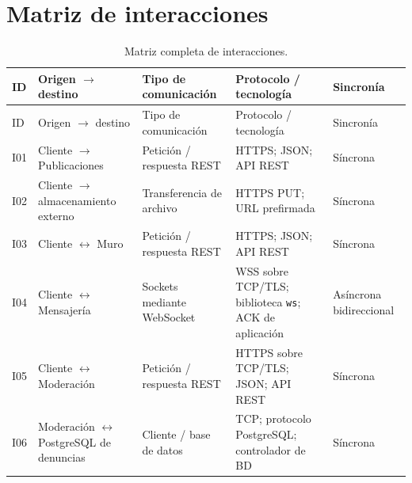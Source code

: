 \documentclass[12pt,a4paper]{article}
\begin{document}

\section{Matriz de interacciones}

\begingroup
\small

\begin{longtable}{@{}p{0.9cm}p{4.4cm}p{2.7cm}p{4.4cm}p{1.8cm}@{}}

\caption{Matriz completa de interacciones.}
\label{tab:interacciones} \\

\toprule
ID & Origen $\rightarrow$ destino & Tipo de comunicación & Protocolo / tecnología & Sincronía \\

\midrule
\endfirsthead

\toprule
ID & Origen $\rightarrow$ destino & Tipo de comunicación & Protocolo / tecnología & Sincronía \\

\midrule
\endhead

\endfoot

\bottomrule
\endlastfoot

I01 &
Cliente $\rightarrow$ Publicaciones &
Petición / respuesta REST &
HTTPS; JSON; API REST &
Síncrona \\

I02 &
Cliente $\rightarrow$ almacenamiento externo &
Transferencia de archivo &
HTTPS PUT; URL prefirmada &
Síncrona \\

I03 &
Cliente $\leftrightarrow$ Muro &
Petición / respuesta REST &
HTTPS; JSON; API REST &
Síncrona \\

I04 &
Cliente $\leftrightarrow$ Mensajería &
Sockets mediante WebSocket &
WSS sobre TCP/TLS; biblioteca \texttt{ws}; ACK de aplicación &
Asíncrona bidireccional \\

I05 &
Cliente $\leftrightarrow$ Moderación &
Petición / respuesta REST &
HTTPS sobre TCP/TLS; JSON; API REST &
Síncrona \\

I06 &
Moderación $\leftrightarrow$ PostgreSQL de denuncias &
Cliente / base de datos &
TCP; protocolo PostgreSQL; controlador de BD &
Síncrona \\


\end{longtable}
\end{document}
